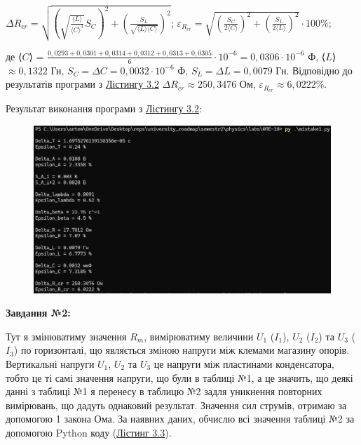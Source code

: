 \documentclass[12pt,a4paper]{article}
\begin{document}
    \begin{center}
    
        $\displaystyle \Delta R_{cr} = \sqrt{\left( \sqrt{\frac{\text{⟨}L\text{⟩}}{\text{⟨}C\text{⟩}^3}} S_C\right)^2 + \left( \frac{S_L}{\sqrt{\text{⟨}L\text{⟩}\text{⟨}C\text{⟩}}} \right)^2}$;
        $\displaystyle \varepsilon_{R_{cr}} = \sqrt{\left( \frac{S_C}{2\text{⟨}C\text{⟩}} \right)^2 + \left( \frac{S_L}{2\text{⟨}L\text{⟩}} \right)^2} \cdot 100 \%$;

    \end{center}

    де ⟨$C$⟩ = $\displaystyle \frac{0,0293 + 0,0301 + 0,0314 + 0,0312 + 0,0313 + 0,0305}{6} \cdot 10^{-6} = 0,0306 \cdot 10^{-6}$ Ф, ⟨$L$⟩ $\approx 0,1322$ Гн, $S_C = \Delta C = 0,0032 \cdot 10^{-6}$ Ф, $S_L = \Delta L = 0,0079$ Гн.
    Відповідно до результатів програми з \hyperlink{listing2}{Лістингу 3.2} $\Delta R_{cr} \approx 250,3476$ Ом, $\varepsilon_{R_{cr}} \approx 6,0222 \%$.

    \setlength{\parindent}{0pt}

    \newpage

    Результат виконання програми з \hyperlink{listing2}{Лістингу 3.2}:

    \begin{figure}[ht]
        \includegraphics[width=1\textwidth]{mistake1_photo.png}
    \end{figure}

    \vspace{2em} %

    \textbf{\large Завдання №2:}
    \vspace{1em} %

    \setlength{\parindent}{1.5em}

    Тут я змінюватиму значення $R_m$, вимірюватиму величини $U_1$ ($I_1$), $U_2$ ($I_2$) та $U_3$ ($I_3$) по горизонталі, що являється зміною напруги між клемами магазину опорів.
    Вертикальні напруги $U_1$, $U_2$ та $U_3$ це напруги між пластинами конденсатора, тобто це ті самі значення напруги, що були в таблиці №1, а це значить, що деякі данні з таблиці №1 я перенесу в таблицю №2 задля
    уникнення повторних вимірювань, що дадуть однаковий результат. Значення сил струмів, отримаю за допомогою 1 закона Ома. За наявних даних, обчислю всі значення таблиці №2 за допомогою Python коду (\hyperlink{listing3}{Лістинг 3.3}).
\end{document}
